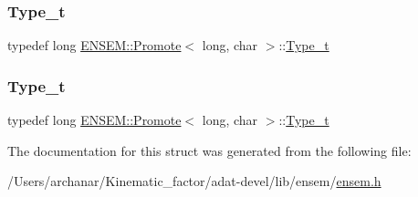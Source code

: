 \subsubsection{\texorpdfstring{Type\_t}{Type\_t}\hspace{0.1cm}{\footnotesize\ttfamily [2/3]}}
{\footnotesize\ttfamily typedef long \mbox{\hyperlink{structENSEM_1_1Promote}{E\+N\+S\+E\+M\+::\+Promote}}$<$ long, char $>$\+::\mbox{\hyperlink{structENSEM_1_1Promote_3_01long_00_01char_01_4_a375f85fa724594195cd72e89a7f3a20c}{Type\+\_\+t}}}

\mbox{\label{structENSEM_1_1Promote_3_01long_00_01char_01_4_a375f85fa724594195cd72e89a7f3a20c}} 
\subsubsection{\texorpdfstring{Type\_t}{Type\_t}\hspace{0.1cm}{\footnotesize\ttfamily [3/3]}}
{\footnotesize\ttfamily typedef long \mbox{\hyperlink{structENSEM_1_1Promote}{E\+N\+S\+E\+M\+::\+Promote}}$<$ long, char $>$\+::\mbox{\hyperlink{structENSEM_1_1Promote_3_01long_00_01char_01_4_a375f85fa724594195cd72e89a7f3a20c}{Type\+\_\+t}}}



The documentation for this struct was generated from the following file\+:\begin{DoxyCompactItemize}
\item 
/\+Users/archanar/\+Kinematic\+\_\+factor/adat-\/devel/lib/ensem/\mbox{\hyperlink{adat-devel_2lib_2ensem_2ensem_8h}{ensem.\+h}}\end{DoxyCompactItemize}
